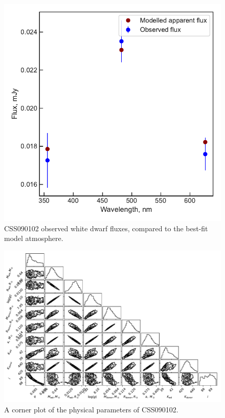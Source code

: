 \begin{figure}
    \centering
    \includegraphics[width=\textwidth]{figures/results/CSS090102/fluxplot.pdf}
    \caption{CSS090102 observed white dwarf fluxes, compared to the best-fit model atmosphere.}
    \label{fig:CSS090102 flux plot}
\end{figure}
\begin{figure}
    \includegraphics[height=\textwidth, angle=90]{figures/results/physicalparams_corners/CSS090102_physcorner.pdf}
    \caption{A corner plot of the physical parameters of CSS090102.}
\end{figure}
\clearpage




